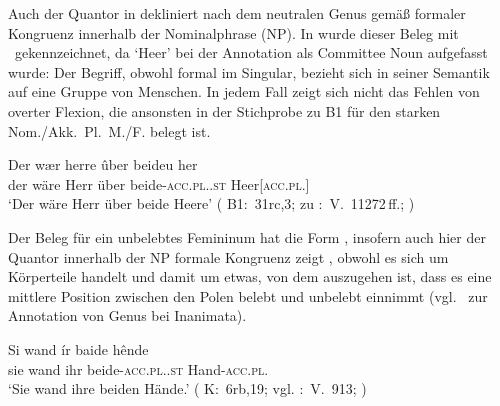 \begin{exe}
\end{exe}

Auch der Quantor in  dekliniert nach dem neutralen Genus
gemäß formaler Kongruenz innerhalb der Nominalphrase (NP). In
 wurde dieser Beleg mit \SA\ gekennzeichnet, da
 `Heer' bei der Annotation als Committee Noun
\autocite[211--213]{corbett2006} aufgefasst wurde: Der Begriff, obwohl formal
im Singular, bezieht sich in seiner Semantik auf eine Gruppe von Menschen. In
jedem Fall zeigt sich nicht das Fehlen von overter Flexion, die ansonsten in
der Stichprobe zu B1 für den starken Nom./Akk.~Pl.~M./F. belegt ist.

\begin{exe}
\ex \label{ex:beideuher}
	\gll Der wær herre ûber beideu her \\
		der wäre Herr über beide-\textsc{acc.pl.\NeutA.st} Heer[\textsc{acc.pl.\NeutA}] \\
	\trans `Der wäre Herr über beide Heere'
		(%
			B1:~31rc,3; zu
			\KC:~V.~11272\,ff.;
			\cite[287]{schroeder1895}%
		)
\end{exe}

Der Beleg für ein unbelebtes Femininum hat die Form , insofern auch
hier der Quantor innerhalb der NP formale Kongruenz zeigt
, obwohl es sich um Körperteile handelt und damit um
etwas, von dem auszugehen ist, dass es eine mittlere Position zwischen den
Polen belebt und unbelebt einnimmt (vgl.~ zur Annotation von
Genus bei Inanimata).

\begin{exe}
	\ex \gll Si wand ír baide hênde \\
			sie wand ihr beide-\textsc{acc.pl.\FemI.st} Hand-\textsc{acc.pl.\FemI} \\
		\trans `Sie wand ihre beiden Hände.'
			(%
				K:~6rb,19; vgl.
				\KC:~V.~913;
				\cite[98]{schroeder1895}%
			)
		\label{ex:uozehende_2}
\end{exe}

